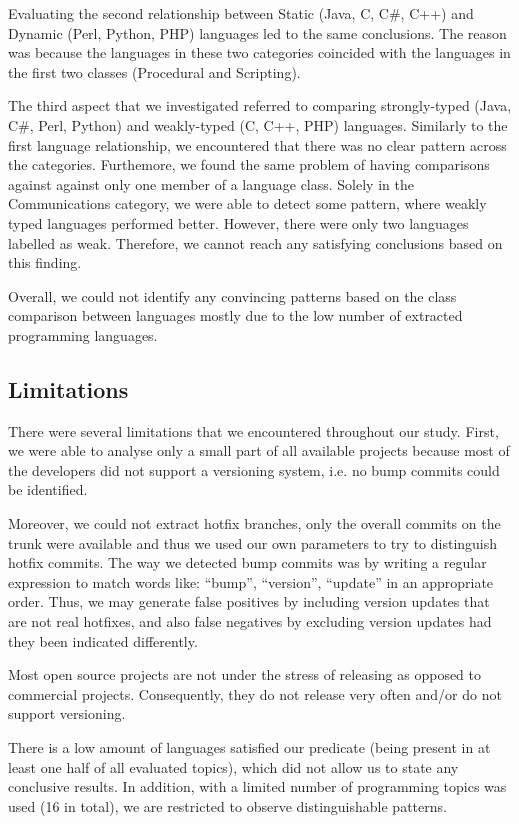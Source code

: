 \documentclass{sig-alternate}
\begin{document}
Evaluating the second relationship between Static (Java, C, C\#, C++) and Dynamic (Perl, Python, PHP) languages led to the same conclusions. The reason was because the languages in these two categories coincided with the languages in the first two classes (Procedural and Scripting).

The third aspect that we investigated referred to comparing strongly-typed (Java, C\#, Perl, Python) and weakly-typed (C, C++, PHP) languages. Similarly to the first language relationship, we encountered that there was no clear pattern across the categories. Furthemore, we found the same problem of having comparisons against against only one member of a language class. Solely in the Communications category, we were able to detect some pattern, where weakly typed languages performed better. However, there were only two languages labelled as weak. Therefore, we cannot reach any satisfying conclusions based on this finding.

Overall, we could not identify any convincing patterns based on the class comparison between languages mostly due to the low number of extracted programming languages.

\subsection{Limitations}
There were several limitations that we encountered throughout our study. First, we were able to analyse only a small part of all available projects because most of the developers did not support a versioning system, i.e. no bump commits could be identified.

Moreover, we could not extract hotfix branches, only the overall commits on the trunk were available and thus we used our own parameters to try to distinguish hotfix commits. The way we detected bump commits was by writing a regular expression to match words like:  ``bump'', ``version'', ``update'' in an appropriate order. Thus, we may generate false positives by including version updates that are not real hotfixes, and also false negatives by excluding version updates had they been indicated differently.

Most open source projects are not under the stress of releasing as opposed to commercial projects. Consequently, they do not release very often and/or do not support versioning.

There is a low amount of languages satisfied our predicate (being present in at least one half of all evaluated topics), which did not allow us to state any conclusive results. In addition, with a limited number of programming topics was used (16 in total), we are restricted to observe distinguishable patterns.
\end{document}

